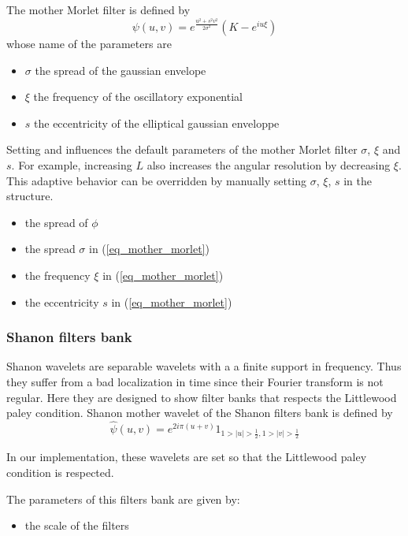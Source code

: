 \documentclass{article}
\begin{document}
The mother Morlet filter is defined by
\begin{equation*}
\label{eq_mother_morlet}
\psi(u,v) = e^{ \frac{u^2 + s^2 v^2}{2 \sigma^2}}(K - e^{i u \xi})
\end{equation*}
whose name of the parameters are
\begin{itemize}
\item $\sigma$ the spread of the gaussian envelope 
\item $\xi$ the frequency of the oscillatory exponential
\item $s$ the eccentricity of the elliptical gaussian enveloppe
\end{itemize}
Setting  and  influences the default parameters of the mother Morlet filter $\sigma$, 
$\xi$ and $s$. For example, increasing $L$ also increases the angular resolution by decreasing $\xi$.
This adaptive behavior can be overridden by manually setting $\sigma$, $\xi$, $s$ in the  structure.
\begin{itemize}
	\item {} the spread of $\phi$
	\item {} the spread $\sigma$ in (\ref{eq_mother_morlet})
	\item {} the frequency $\xi$ in (\ref{eq_mother_morlet})
	\item {} the eccentricity $s$ in (\ref{eq_mother_morlet})
\end{itemize}	
\subsubsection{Shanon filters bank}
Shanon wavelets are separable wavelets with a a finite support in frequency. Thus they suffer from a bad localization in time since their Fourier transform is not regular. Here they are designed to show filter banks that respects the Littlewood paley condition. Shanon mother wavelet of the Shanon filters bank is defined by
\begin{equation}
\label{eq_shanon_filters_bank}
\hat\psi(u,v) = e^{2i\pi(u+v)}1_{1>|u|>\frac{1}{2},1>|v|>\frac{1}{2}}
\end{equation}

In our implementation, these wavelets are set so that the Littlewood paley condition is respected.

The parameters of this filters bank are given by:

\begin{itemize}
    \item {} the scale of the filters
\end{itemize}	
\end{document}

